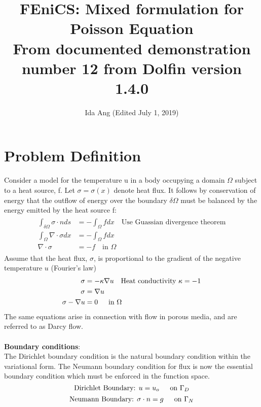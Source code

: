 \documentclass[12pt,3p]{article}
\begin{document}
\title{FEniCS: Mixed formulation for Poisson Equation \\
	\large{From documented demonstration number 12 from Dolfin version 1.4.0}}
\author{Ida Ang (Edited July 1, 2019)}
\date{\vspace{-5ex}}
\maketitle

\section{Problem Definition}
Consider a model for the temperature u in a body occupying a domain $\Omega$ subject to a heat source, f. Let $\sigma = \sigma(x)$ denote heat flux. It follows by conservation of energy that the outflow of energy over the boundary $\delta \Omega$ must be balanced by the energy emitted by the heat source f: 
\begin{align}\label{ProbDef1}
\begin{split}
\int_{\delta \Omega} \sigma \cdot n ds &= - \int_{\Omega}  f dx \quad \text{Use Guassian divergence theorem} \\
\int_{\Omega} \nabla \cdot \sigma dx &= - \int_{\Omega}  f dx \\
\nabla \cdot \sigma &= - f \quad \text{in } \Omega
\end{split}
\end{align}
Assume that the heat flux, $\sigma$, is proportional to the gradient of the negative temperature $u$ (Fourier's law)
\begin{align}\label{ProbDef2}
\begin{split}
\sigma &= - \kappa \nabla u \quad \text{Heat conductivity } \kappa = -1 \\
\sigma &= \nabla u \\
\sigma - \nabla u &= 0 \indent \text{in } \Omega
\end{split}
\end{align}
The same equations arise in connection with flow in porous media, and are referred to as Darcy flow. \\ \\
\textbf{Boundary conditions}: \\
The Dirichlet boundary condition is the natural boundary condition within the variational form. The Neumann boundary condition for flux is now the essential boundary condition which must be enforced in the function space.
\begin{equation}\label{DBound}
\text{Dirichlet Boundary: } u = u_o \indent \text{on } \Gamma_D
\end{equation}
\begin{equation}\label{NBound}
\text{Neumann Boundary: }\sigma \cdot n = g \indent \text{on } \Gamma_N
\end{equation}
\end{document}
